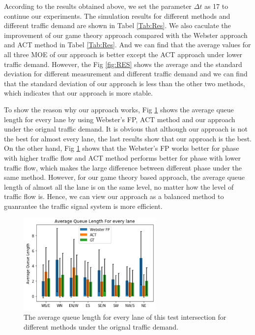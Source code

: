 \documentclass[a4paper, 10pt, conference]{ieeeconf}      %
\begin{document}
According to the results obtained above, we set the parameter $\Delta t$ as 17 to continue our experiments. 
The simulation results for different methods and different traffic demand are shown in Tabel \ref{Tab:Res}. We also caculate the improvement
of our game theory approach compared with the Webster approach and ACT method in Tabel \ref{Tab:Res}. And we can find that the average values
for all three MOE of our approach is better except the ACT approach under lower traffic demand. However, the Fig \ref{fig:RES} shows the 
average and the standard deviation for different measurement and different traffic demand and we can find that the standard deviation of our 
approach is less than the other two methods, which indicates that our approach is more stable.

To show the reason why our approach works, Fig \ref{fig:AQLEL} shows the average queue length for every lane by using Webster's FP, ACT method and 
our approach under the orignal traffic demand. It is obvious that although our approach is not the best for almost every lane, the last results 
show that our approach is the best. On the other hand, Fig \ref{fig:AQLEL} shows that the Webster's FP works better for phase with higher traffic flow
and ACT method performs better for phase with lower traffic flow, which makes the large difference between different phase under the same method.
However, for our game theory based approach, the average queue length of almost all the lane is on the same level, no matter how the level of 
traffic flow is. Hence, we can view our approach as a balanced method to guanrantee the traffic signal system is more efficient. 

\begin{figure}[thbp]
        \centering
        \includegraphics[width=2.8in]{figures/AQLeverylane.PNG}
        \caption{The average queue length for every lane of this test intersection for different methods under the orignal traffic demand.}
        \label{fig:AQLEL}
\end{figure}
\end{document}
